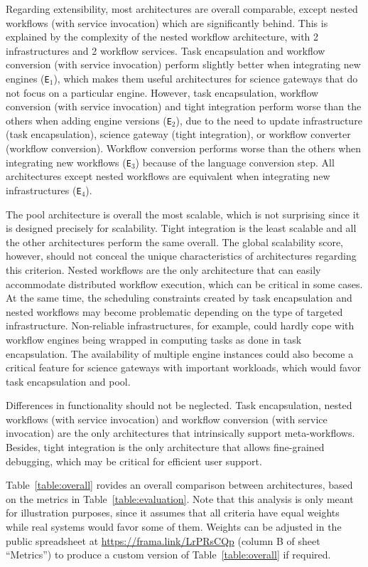\documentclass[preprint,3p,twocolumn]{elsarticle}
\newcommand{\todo}[2]{\pdfmargincomment[color=red,author=#1,open=true]{#2}}
\newcommand{\correction}[1]{\color{blue}#1\color{black}\xspace}
\begin{document}
Regarding extensibility, most architectures are overall comparable,
except nested workflows (with service invocation) which are
significantly behind. This is explained by the complexity of the
nested workflow architecture, with 2 infrastructures and 2 workflow
services. Task encapsulation and workflow conversion (with service
invocation) perform slightly better when integrating new engines
(\texttt{E$_1$}), which makes them useful architectures for science
gateways that do not focus on a particular engine.  However, task encapsulation, workflow conversion (with
service invocation) and tight integration perform worse than the
others when adding engine versions (\texttt{E$_2$}), due to the need
to update infrastructure (task encapsulation), science gateway (tight
integration), or workflow converter (workflow conversion). Workflow conversion
performs worse than the others when integrating new workflows
(\texttt{E$_3$}) because of the language conversion step. All
architectures except nested workflows are equivalent when integrating
new infrastructures (\texttt{E$_4$}).

The pool architecture is overall the most scalable, which is not
surprising since it is designed precisely for scalability. Tight
integration is the least scalable and all the other architectures
perform the same overall. The global scalability score, however,
should not conceal the unique characteristics of architectures regarding
this criterion. Nested workflows are the only architecture that can
easily accommodate distributed workflow execution, which can be
critical in some cases. At the same time, the scheduling constraints
created by task encapsulation and nested workflows may become problematic  depending on the type of targeted
infrastructure. Non-reliable infrastructures,
for example, could hardly cope with workflow engines being wrapped in
computing tasks as done in task encapsulation. The availability of
multiple engine instances could also become a critical feature for
science gateways with important workloads, which would favor task
encapsulation and pool.

Differences in \correction{functionality} should not be neglected. Task
encapsulation, nested workflows (with service invocation) and workflow
conversion (with service invocation) are the only architectures that
intrinsically support meta-workflows. Besides, tight integration is
the only architecture that allows fine-grained debugging, which may be
critical for efficient user support.

Table~\ref{table:overall} \todo{update with new architecture?} provides an overall comparison between
architectures, based on the metrics in Table~\ref{table:evaluation}.
Note that this analysis is only meant for illustration purposes, since
it assumes that all criteria have equal weights while real systems
would favor some of them. \correction{Weights can be adjusted in the
  public spreadsheet at \url{https://frama.link/LrPRsCQp} (column B of
  sheet ``Metrics'') to produce a custom version of
  Table~\ref{table:overall} if required.}
\end{document}
